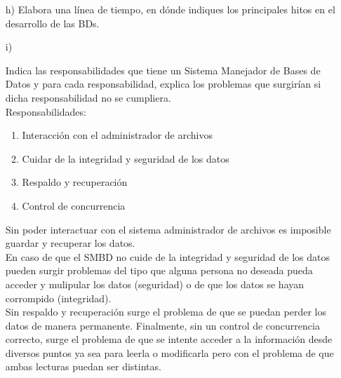 \documentclass[a4paper, 12pt]{report}
\begin{document}
\begin{enumerate}
{\begin{enumerate}
{    es un sistema cerrado, todas las operaciones son siempre tablas.\\
    \textbf{Modelo Orientado a Objetos.} Los datos se modelan como
    objetos, se tiene comportamiento (métodos o funciones) y estado.\\
    \textbf{Modelo Semiestructurado.} Es una colección de nodos y
    cada nodo tiene datos con diferentes esquemas, esto lo hace un
    sistema menos rígido.\\
    \textbf{Modelo Objeto-Relacional} Representa los datos como tablas,
    permite construir tipos de objetos complejos, capacidad para
    encapsular y asociar métodos a los objetos.}
    \item[h)]{Elabora una línea de tiempo, en dónde indiques los principales hitos en el desarrollo de las BDs.}
    \item[i)]{Indica las responsabilidades que tiene un Sistema Manejador de
                Bases de Datos y para cada responsabilidad, explica los problemas
                que surgirían si dicha responsabilidad no se cumpliera.\\
        Responsabilidades:\\
        \begin{enumerate}
            \item{Interacción con el administrador de archivos}
            \item{Cuidar de la integridad y seguridad de los datos}
            \item{Respaldo y recuperación}
            \item{Control de concurrencia}
        \end{enumerate}
        Sin poder interactuar con el sistema administrador de archivos es imposible
        guardar y recuperar los datos.\\
        En caso de que el SMBD no cuide de la integridad y seguridad de los datos
        pueden surgir problemas del tipo que alguna persona no deseada pueda acceder
        y mulipular los datos (seguridad) o de que los datos se hayan corrompido
        (integridad).\\
        Sin respaldo y recuperación surge el problema de que se puedan perder los
        datos de manera permanente.
        Finalmente, sin un control de concurrencia correcto, surge el problema de
        que se intente acceder a la información desde diversos puntos ya sea para
        leerla o modificarla pero con el problema de que ambas lecturas puedan
        ser distintas.
        \cite{RDBMS}
}
\end{enumerate}}
\end{enumerate}
\end{document}
